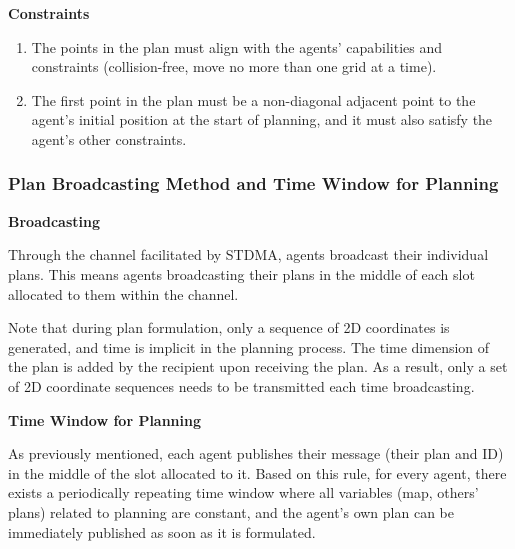 \textbf{Constraints}

\begin{enumerate}
    \item The points in the plan must align with the agents' capabilities and constraints (collision-free, move no more than one grid at a time).
    \item The first point in the plan must be a non-diagonal adjacent point to the agent's initial position at the start of planning, and it must also satisfy the agent's other constraints.
\end{enumerate}


\subsubsection{Plan Broadcasting Method and Time Window for Planning}

\textbf{Broadcasting}

Through the channel facilitated by STDMA, agents broadcast their individual plans. 
This means agents broadcasting their plans in the middle of each slot allocated to them within the channel.

Note that during plan formulation, only a sequence of 2D coordinates is generated, and time is implicit in the planning process. The time dimension of the plan is added by the recipient upon receiving the plan.
As a result, only a set of 2D coordinate sequences needs to be transmitted each time broadcasting.



\textbf{Time Window for Planning}

As previously mentioned, each agent publishes their message (their plan and ID) in the middle of the slot allocated to it.
Based on this rule, for every agent, there exists a periodically repeating time window where all variables (map, others' plans) related to planning are constant, 
and the agent's own plan can be immediately published as soon as it is formulated.

